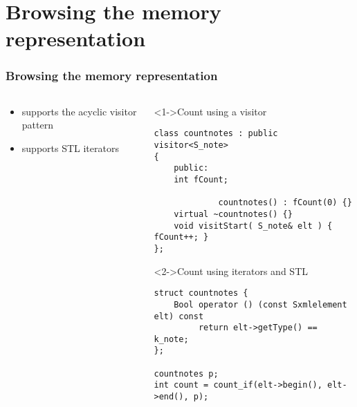 \documentclass{beamer}
\begin{document}
\section{Browsing the memory representation}
\begin{frame}[fragile]
  \frametitle{Browsing the memory representation}

  \begin{columns}
    \begin{column}[c]{50mm}
    \begin{itemize}
      \item<1-> supports the acyclic visitor pattern
    \vspace{25mm}
      \item<2-> supports STL iterators
     \end{itemize}
    \end{column}

    \begin{column}[c]{65mm}
    \begin{block}<1->{Count using a visitor}
\begin{lstlisting}
class countnotes : public visitor<S_note>
{
    public:
    int fCount;

             countnotes() : fCount(0) {}
    virtual ~countnotes() {}
    void visitStart( S_note& elt ) { fCount++; }
};
\end{lstlisting}
    \end{block}

    \begin{block}<2->{Count using iterators and STL}
\begin{lstlisting}
struct countnotes {
    Bool operator () (const Sxmlelement elt) const
         return elt->getType() == k_note;
};

countnotes p;
int count = count_if(elt->begin(), elt->end(), p);
\end{lstlisting}
    \end{block}
    \end{column}
  \end{columns}
\end{frame}

\end{document}
